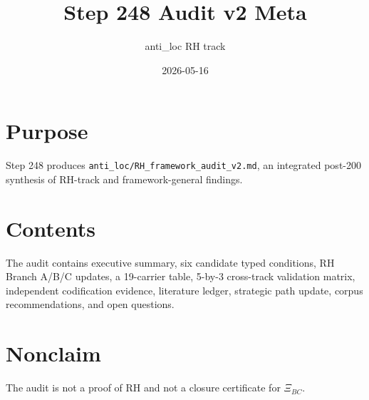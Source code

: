 \documentclass[11pt]{article}
\title{Step 248 Audit v2 Meta}
\author{anti\_loc RH track}
\date{2026-05-16}
\begin{document}
\maketitle
\section*{Purpose}
Step 248 produces \texttt{anti\_loc/RH\_framework\_audit\_v2.md}, an integrated post-200 synthesis of RH-track and framework-general findings.
\section*{Contents}
The audit contains executive summary, six candidate typed conditions, RH Branch A/B/C updates, a 19-carrier table, 5-by-3 cross-track validation matrix, independent codification evidence, literature ledger, strategic path update, corpus recommendations, and open questions.
\section*{Nonclaim}
The audit is not a proof of RH and not a closure certificate for \(\Xi_{BC}\).
\end{document}
